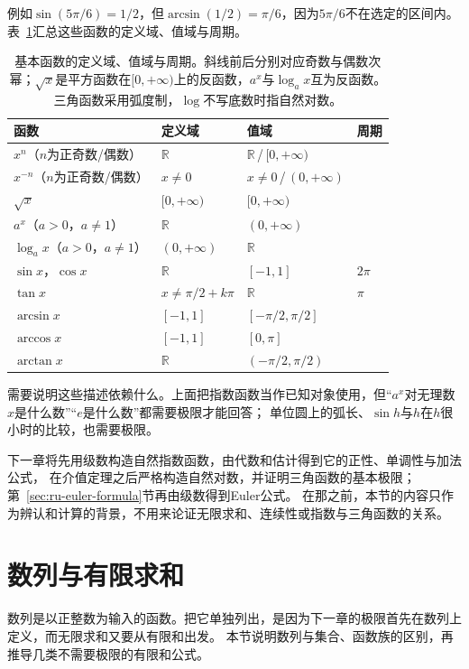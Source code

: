 例如$\sin(5\pi/6)=1/2$，但$\arcsin(1/2)=\pi/6$，因为$5\pi/6$不在选定的区间内。表~\ref{tab:ru-elementary-functions}汇总这些函数的定义域、值域与周期。

\begin{table}[htbp]
 \centering\small
 \begin{tabular}{@{}llll@{}}
 \toprule
 函数 & 定义域 & 值域 & 周期\\
 \midrule
 $x^n$（$n$为正奇数/偶数） & $\mathbb R$ & $\mathbb R$\,/\,$[0,+\infty)$ & \\
 $x^{-n}$（$n$为正奇数/偶数） & $x\neq0$ & $x\neq0$\,/\,$(0,+\infty)$ & \\
 $\sqrt x$ & $[0,+\infty)$ & $[0,+\infty)$ & \\
 $a^x$（$a>0$，$a\neq1$） & $\mathbb R$ & $(0,+\infty)$ & \\
 $\log_ax$（$a>0$，$a\neq1$） & $(0,+\infty)$ & $\mathbb R$ & \\
 $\sin x$，$\cos x$ & $\mathbb R$ & $[-1,1]$ & $2\pi$\\
 $\tan x$ & $x\neq\pi/2+k\pi$ & $\mathbb R$ & $\pi$\\
 $\arcsin x$ & $[-1,1]$ & $[-\pi/2,\pi/2]$ & \\
 $\arccos x$ & $[-1,1]$ & $[0,\pi]$ & \\
 $\arctan x$ & $\mathbb R$ & $(-\pi/2,\pi/2)$ & \\
 \bottomrule
 \end{tabular}
 \caption{基本函数的定义域、值域与周期。斜线前后分别对应奇数与偶数次幂；$\sqrt x$是平方函数在$[0,+\infty)$上的反函数，$a^x$与$\log_ax$互为反函数。三角函数采用弧度制，$\log$不写底数时指自然对数。}
 \label{tab:ru-elementary-functions}
\end{table}

需要说明这些描述依赖什么。上面把指数函数当作已知对象使用，但“$a^x$对无理数$x$是什么数”“$e$是什么数”都需要极限才能回答；
单位圆上的弧长、$\sin h$与$h$在$h$很小时的比较，也需要极限。

下一章将先用级数构造自然指数函数，由代数和估计得到它的正性、单调性与加法公式，
在介值定理之后严格构造自然对数，并证明三角函数的基本极限；第~\ref{sec:ru-euler-formula}节再由级数得到Euler公式。
在那之前，本节的内容只作为辨认和计算的背景，不用来论证无限求和、连续性或指数与三角函数的关系。
\section{数列与有限求和}
\label{sec:ru-sequences-finite-sums}

数列是以正整数为输入的函数。把它单独列出，是因为下一章的极限首先在数列上定义，而无限求和又要从有限和出发。
本节说明数列与集合、函数族的区别，再推导几类不需要极限的有限和公式。

